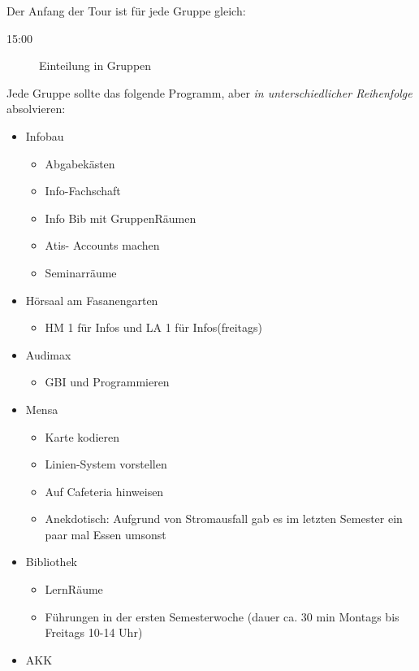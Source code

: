 \documentclass[10pt,ngerman]{scrartcl}
\begin{document}
\begin{multicols}{2}
Der Anfang der Tour ist für jede Gruppe gleich:
\begin{description}
    \item [{15:00}] Einteilung in Gruppen\setlength{\itemsep}{0pt}
\end{description}
Jede Gruppe sollte das folgende Programm, aber \emph{in unterschiedlicher Reihenfolge} absolvieren:
\begin{itemize}
    \item Infobau
        \begin{itemize}
            \item Abgabekästen
            \item Info-Fachschaft
            \item Info Bib mit GruppenRäumen
            \item Atis- Accounts machen
            \item Seminarräume
        \end{itemize}
    \item Hörsaal am Fasanengarten
        \begin{itemize}
            \item HM 1 für Infos und LA 1 für Infos(freitags)
        \end{itemize}
    \item Audimax
        \begin{itemize}
            \item GBI und Programmieren
        \end{itemize}
    \item Mensa
        \begin{itemize}
            \item Karte kodieren
            \item Linien-System vorstellen
            \item Auf Cafeteria hinweisen
            \item Anekdotisch: Aufgrund von Stromausfall gab es im letzten Semester ein paar mal Essen umsonst
        \end{itemize}
    \item Bibliothek
        \begin{itemize}
            \item LernRäume
            \item Führungen in der ersten Semesterwoche (dauer ca. 30 min Montags bis Freitags 10-14 Uhr)
        \end{itemize}
    \item AKK
        \begin{itemize}

\end{itemize}
\end{itemize}
\end{multicols}
\end{document}
